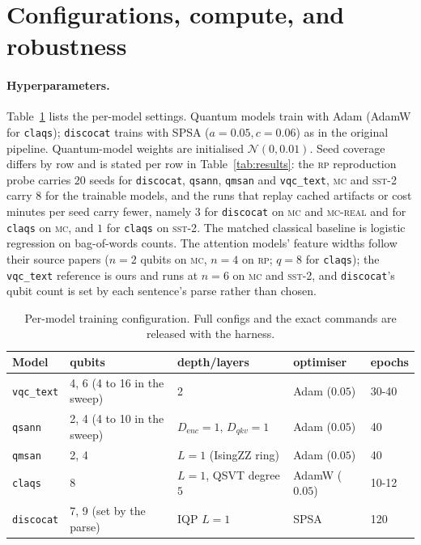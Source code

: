 \section{Configurations, compute, and robustness}\label{app:configs}
\paragraph{Hyperparameters.} Table~\ref{tab:hparams} lists the per-model settings. Quantum
models train with Adam (AdamW for \texttt{claqs}); \texttt{discocat} trains with SPSA
($a{=}0.05,c{=}0.06$) as in the original pipeline. Quantum-model weights are initialised
$\mathcal{N}(0,0.01)$. Seed coverage differs by row and is stated per row in
Table~\ref{tab:results}: the \textsc{rp} reproduction probe carries $20$ seeds for
\texttt{discocat}, \texttt{qsann}, \texttt{qmsan} and \texttt{vqc\_text}, \textsc{mc} and
\textsc{sst-2} carry $8$ for the trainable models, and the runs that replay cached artifacts or
cost minutes per seed carry fewer, namely $3$ for \texttt{discocat} on \textsc{mc} and
\textsc{mc-real} and for \texttt{claqs} on \textsc{mc}, and $1$ for \texttt{claqs} on
\textsc{sst-2}. The matched classical baseline is
logistic regression on bag-of-words counts. The attention models' feature widths follow their source
papers ($n{=}2$ qubits on \textsc{mc}, $n{=}4$ on \textsc{rp}; $q{=}8$ for \texttt{claqs}); the
\texttt{vqc\_text} reference is ours and runs at $n{=}6$ on \textsc{mc} and \textsc{sst-2}, and
\texttt{discocat}'s qubit count is set by each sentence's parse rather than chosen.

\begin{table}[h]
\centering\small
\begin{tabular}{lllll}
\toprule
Model & qubits & depth/layers & optimiser & epochs \\
\midrule
\texttt{vqc\_text} & 4, 6 (4 to 16 in the sweep) & 2 & Adam ($0.05$) & 30-40 \\
\texttt{qsann}     & 2, 4 (4 to 10 in the sweep) & $D_{\mathrm enc}{=}1,\,D_{qkv}{=}1$ & Adam ($0.05$) & 40 \\
\texttt{qmsan}     & 2, 4 & $L{=}1$ (IsingZZ ring) & Adam ($0.05$) & 40 \\
\texttt{claqs}     & 8    & $L{=}1$, QSVT degree $5$ & AdamW ($0.05$) & 10-12 \\
\texttt{discocat}  & 7, 9 (set by the parse) & IQP $L{=}1$ & SPSA & 120 \\
\bottomrule
\end{tabular}
\caption{Per-model training configuration. Full configs and the exact commands are released
with the harness.}
\label{tab:hparams}
\end{table}

